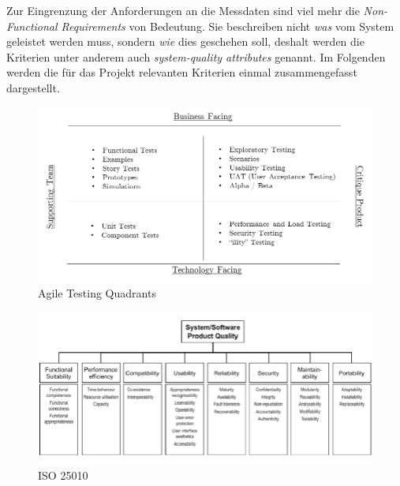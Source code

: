 Zur Eingrenzung der Anforderungen an die Messdaten sind viel mehr die \emph{Non-Functional Requirements} von Bedeutung. Sie beschreiben nicht \emph{was} vom System geleistet werden muss, sondern \emph{wie} dies geschehen soll, deshalt werden die Kriterien unter anderem auch \emph{system-quality attributes} genannt. Im Folgenden werden die für das Projekt relevanten Kriterien einmal zusammengefasst dargestellt.

\begin{figure}[h!]
	\centering
	\includegraphics[width=\linewidth]{kapitel/vorgehensmodell/_img/agile-testing-quadrants}
	\caption[Agile Testing Quadrants]{Agile Testing Quadrants}
	\label{fig:testing-quad}
\end{figure}

\begin{figure}[h!]
	\centering
	\includegraphics[width=\linewidth]{kapitel/vorgehensmodell/_img/iso25010}
	\caption[iso25010]{ISO 25010}
	\label{fig:iso25010}
\end{figure}



